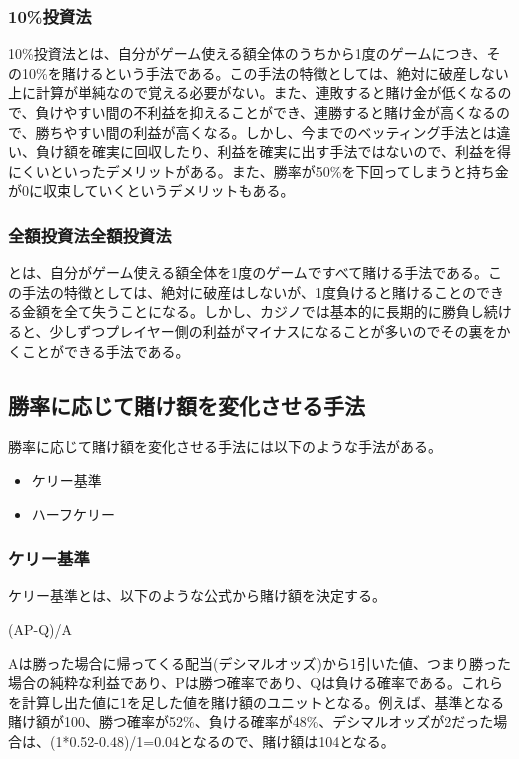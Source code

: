 \subsubsection{10\%投資法}
10\%投資法とは、自分がゲーム使える額全体のうちから1度のゲームにつき、その10\%を賭けるという手法である。この手法の特徴としては、絶対に破産しない上に計算が単純なので覚える必要がない。また、連敗すると賭け金が低くなるので、負けやすい間の不利益を抑えることができ、連勝すると賭け金が高くなるので、勝ちやすい間の利益が高くなる。しかし、今までのベッティング手法とは違い、負け額を確実に回収したり、利益を確実に出す手法ではないので、利益を得にくいといったデメリットがある。また、勝率が50\%を下回ってしまうと持ち金が0に収束していくというデメリットもある。
\subsubsection{全額投資法全額投資法}
とは、自分がゲーム使える額全体を1度のゲームですべて賭ける手法である。この手法の特徴としては、絶対に破産はしないが、1度負けると賭けることのできる金額を全て失うことになる。しかし、カジノでは基本的に長期的に勝負し続けると、少しずつプレイヤー側の利益がマイナスになることが多いのでその裏をかくことができる手法である。

\subsection{勝率に応じて賭け額を変化させる手法}
勝率に応じて賭け額を変化させる手法には以下のような手法がある。
\begin{itemize}
\item ケリー基準
\item ハーフケリー
\end{itemize}
\subsubsection{ケリー基準}
ケリー基準とは、以下のような公式から賭け額を決定する。
\begin{center}
(AP-Q)/A
\end{center}
Aは勝った場合に帰ってくる配当(デシマルオッズ)から1引いた値、つまり勝った場合の純粋な利益であり、Pは勝つ確率であり、Qは負ける確率である。これらを計算し出た値に1を足した値を賭け額のユニットとなる。例えば、基準となる賭け額が100、勝つ確率が52\%、負ける確率が48\%、デシマルオッズが2だった場合は、(1*0.52-0.48)/1=0.04となるので、賭け額は104となる。
